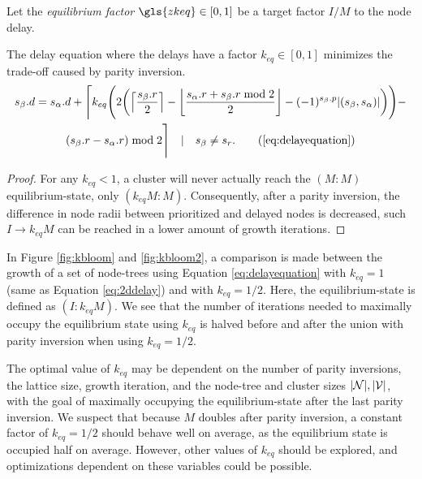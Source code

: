 \begin{definition}\label{def:keq}
  Let the \emph{equilibrium factor} $\gls{zkeq}\in [0,1]$ be a target factor $I/M$ to the node delay. 
\end{definition}
\begin{lemma}\label{lem:keq}
  The delay equation where the delays have a factor $k_{eq}\in [0,1]$ minimizes the trade-off caused by parity inversion. 
  \begin{multline}
    s_\beta.d = s_\alpha.d + \Bigg \lceil k_{eq} \Bigg( 2\bigg(\ceil{\frac{s_\beta.r}{2}} - \floor{\frac{s_\alpha.r + s_\beta.r \bmod 2}{2}} - (-1)^{s_\beta.p}\abs{(s_\beta,s_\alpha)}\bigg)
    \Bigg) - \\
    (s_\beta.r - s_\alpha.r) \bmod 2 \Bigg \rceil \hspace{1em} | \hspace{1em} s_\beta \neq s_r. \tag{\ref{eq:delayequation}}
  \end{multline}
\end{lemma}
\begin{proof}
  For any $k_{eq} < 1$, a cluster will never actually reach the $(M:M)$ equilibrium-state, only $(k_{eq}M:M)$. Consequently, after a parity inversion, the difference in node radii between prioritized and delayed nodes is decreased, such $I\to k_{eq}M$ can be reached in a lower amount of growth iterations. 
\end{proof}

In Figure \ref{fig:kbloom} and \ref{fig:kbloom2}, a comparison is made between the growth of a set of node-trees using Equation \eqref{eq:delayequation} with $k_{eq}=1$ (same as Equation \eqref{eq:2ddelay}) and with $k_{eq}=1/2$. Here, the equilibrium-state is defined as $(I:k_{eq}M)$. We see that the number of iterations needed to maximally occupy the equilibrium state using $k_{eq}$ is halved before and after the union with parity inversion when using $k_{eq} = 1/2$. 

The optimal value of $k_{eq}$ may be dependent on the number of parity inversions, the lattice size, growth iteration, and the node-tree and cluster sizes $|\mathcal{N}|, |\mathcal{V}|$, with the goal of maximally occupying the equilibrium-state after the last parity inversion. We suspect that because $M$ doubles after parity inversion, a constant factor of $k_{eq}=1/2$ should behave well on average, as the equilibrium state is occupied half on average. However, other values of $k_{eq}$ should be explored, and optimizations dependent on these variables could be possible. 

